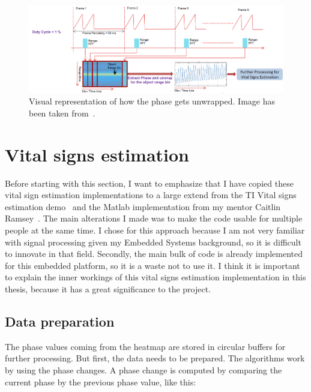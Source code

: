\begin{figure}[t]
\centering
\includegraphics[width=.95\textwidth]{figures/measuring_vital_signs/phase_unwrapping.png}
\caption{Visual representation of how the phase gets unwrapped. Image has been taken from~\cite{vital_signs_lab_website}.}
\label{fig:phase_unwrapping}
\end{figure}

\section{Vital signs estimation}
Before starting with this section, I want to emphasize that I have copied these vital sign estimation implementations to a large extend from the TI Vital signs estimation demo~\cite{vital_signs_lab_website} and the Matlab implementation from my mentor Caitlin Ramsey~\cite{caitlin_msc_thesis_2020}. The main alterations I made was to make the code usable for multiple people at the same time. I chose for this approach because I am not very familiar with signal processing given my Embedded Systems background, so it is difficult to innovate in that field. Secondly, the main bulk of code is already implemented for this embedded platform, so it is a waste not to use it. I think it is important to explain the inner workings of this vital signs estimation implementation in this thesis, because it has a great significance to the project.


\subsection{Data preparation}
The phase values coming from the heatmap are stored in circular buffers for further processing. But first, the data needs to be prepared. The algorithms work by using the phase changes. A phase change is computed by comparing the current phase by the previous phase value, like this:

